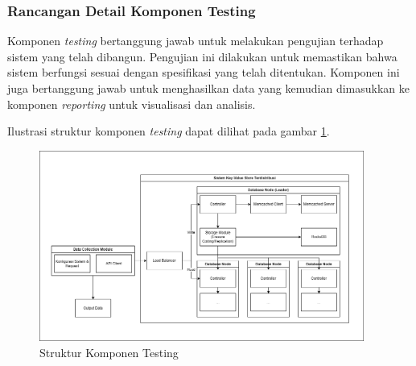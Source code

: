 \subsubsection{Rancangan Detail Komponen Testing}
\label{subsubsection:detail-data-collector}

Komponen \textit{testing} bertanggung jawab untuk melakukan pengujian terhadap sistem yang telah dibangun. Pengujian ini dilakukan untuk memastikan bahwa sistem berfungsi sesuai dengan spesifikasi yang telah ditentukan. Komponen ini juga bertanggung jawab untuk menghasilkan data yang kemudian dimasukkan ke komponen \textit{reporting} untuk visualisasi dan analisis.

Ilustrasi struktur komponen \textit{testing} dapat dilihat pada gambar \ref{fig:testing-structure}.

\begin{figure}[ht]
    \centering
    \includegraphics[width=0.95\textwidth]{resources/chapter-3/general-architecture.png}
    \caption{Struktur Komponen Testing}
    \label{fig:testing-structure}
\end{figure}